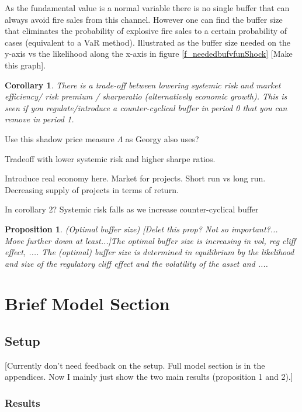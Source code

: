 \documentclass[11pt]{article}
\newtheorem{proposition}{Proposition}
\newtheorem{corollary}{Corollary}
\begin{document}
\begin{appendices}
As the fundamental value is a normal variable there is no single buffer that can always avoid fire sales from this channel. However one can find the buffer size that eliminates the probability of explosive fire sales to a certain probability of cases (equivalent to a VaR method). Illustrated as the buffer size needed on the y-axis vs the likelihood along the x-axis in figure \ref{f_neededbufvfunShock} [Make this graph].

\begin{corollary}
There is a trade-off between lowering systemic risk and market efficiency/ risk premium / sharperatio (alternatively economic growth). This is seen if you regulate/introduce a counter-cyclical buffer in period 0 that you can remove in period 1.
\end{corollary}

Use this shadow price measure $\Lambda$ as Georgy also uses?

Tradeoff with lower systemic risk and higher sharpe ratios.

Introduce real economy here. Market for projects. Short run vs long run. Decreasing supply of projects in terms of return.

In corollary 2? Systemic risk falls as we increase counter-cyclical buffer

\begin{proposition} (Optimal buffer size)
[Delet this prop? Not so important?... Move further down at least...]The optimal buffer size is increasing in vol, reg cliff effect, ....
The (optimal) buffer size is determined in equilibrium by the likelihood and size of the regulatory cliff effect and the volatility of the asset and .... 
\end{proposition}
\fi



\iffalse
\section{Brief Model Section} \label{sec:modelAppendix}

\subsection*{Setup}
[Currently don't need feedback on the setup. Full model section is in the appendices. Now I mainly just show the two main results (proposition 1 and 2).]

\subsubsection*{Results}


\end{appendices}
\end{document}
